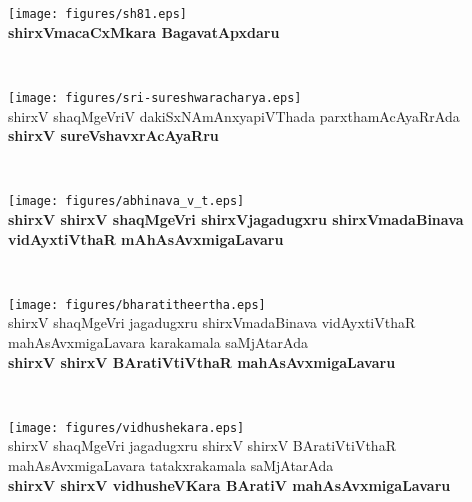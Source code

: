 \thispagestyle{empty}
\begin{center}
\vfill
\thispagestyle{empty}
\texttt{[image: figures/sh81.eps]}\\
{\bf shirxVmacaCxMkara BagavatApxdaru}
\vfill
\end{center}
\newpage
~\thispagestyle{empty}
\newpage
\begin{center}
\vfill
\thispagestyle{empty}
\texttt{[image: figures/sri-sureshwaracharya.eps]}\\
shirxV shaqMgeVriV dakiSxNAmAnxyapiVThada parxthamAcAyaRrAda\\ {\bf shirxV sureVshavxrAcAyaRru}
\vfill
\end{center}
\newpage
~\thispagestyle{empty}
\newpage
\begin{center}
\vfill
\thispagestyle{empty}
\texttt{[image: figures/abhinava\_v\_t.eps]}\\
{\bf shirxV shirxV shaqMgeVri shirxVjagadugxru shirxVmadaBinava\\ vidAyxtiVthaR mAhAsAvxmigaLavaru}
\vfill
\end{center}
\newpage
~\thispagestyle{empty}
\newpage
\begin{center}
\vfill
\thispagestyle{empty}
\texttt{[image: figures/bharatitheertha.eps]}\\
shirxV shaqMgeVri jagadugxru  shirxVmadaBinava vidAyxtiVthaR\\ mahAsAvxmigaLavara karakamala saMjAtarAda\\ 
{\bf shirxV shirxV BAratiVtiVthaR mahAsAvxmigaLavaru}
\vfill
\end{center}
\newpage
~\thispagestyle{empty}
\newpage
\begin{center}
\vfill
\thispagestyle{empty}
\texttt{[image: figures/vidhushekara.eps]}\\
shirxV shaqMgeVri jagadugxru shirxV shirxV BAratiVtiVthaR\\ mahAsAvxmigaLavara tatakxrakamala saMjAtarAda\\ 
{\bf shirxV shirxV vidhusheVKara BAratiV mahAsAvxmigaLavaru}
\vfill
\end{center}
